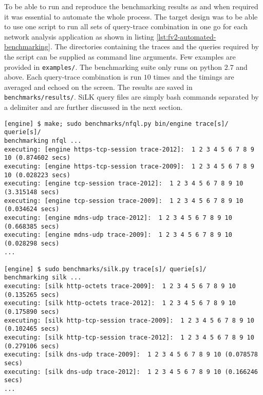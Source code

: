 To be able to run and reproduce the benchmarking results as and when required
it was essential to automate the whole process. The target design was to be
able to use one script to run all sets of query-trace combination in one go
for each network analysis application as shown in listing
\ref{lst:fv2-automated-benchmarking}. The directories containing the traces
and the queries required by the script can be supplied as command line
arguments. Few examples are provided in \texttt{examples/}. The benchmarking
suite only runs on python $2.7$ and above. Each query-trace combination is run
$10$ times and the timings are averaged and echoed on the screen. The results
are saved in \texttt{benchmarks/results/}. SiLK query files are simply bash
commands separated by a delimiter and are further discussed in the next
section.

\begin{lstlisting}
[engine] $ make; sudo benchmarks/nfql.py bin/engine trace[s]/ querie[s]/
benchmarking nfql ...
executing: [engine https-tcp-session trace-2012]:  1 2 3 4 5 6 7 8 9 10 (0.874602 secs)
executing: [engine https-tcp-session trace-2009]:  1 2 3 4 5 6 7 8 9 10 (0.028223 secs)
executing: [engine tcp-session trace-2012]:  1 2 3 4 5 6 7 8 9 10 (3.315148 secs)
executing: [engine tcp-session trace-2009]:  1 2 3 4 5 6 7 8 9 10 (0.034624 secs)
executing: [engine mdns-udp trace-2012]:  1 2 3 4 5 6 7 8 9 10 (0.668385 secs)
executing: [engine mdns-udp trace-2009]:  1 2 3 4 5 6 7 8 9 10 (0.028298 secs)
...

[engine] $ sudo benchmarks/silk.py trace[s]/ querie[s]/
benchmarking silk ...
executing: [silk http-octets trace-2009]:  1 2 3 4 5 6 7 8 9 10 (0.135265 secs)
executing: [silk http-octets trace-2012]:  1 2 3 4 5 6 7 8 9 10 (0.175890 secs)
executing: [silk http-tcp-session trace-2009]:  1 2 3 4 5 6 7 8 9 10 (0.102465 secs)
executing: [silk http-tcp-session trace-2012]:  1 2 3 4 5 6 7 8 9 10 (0.279106 secs)
executing: [silk dns-udp trace-2009]:  1 2 3 4 5 6 7 8 9 10 (0.078578 secs)
executing: [silk dns-udp trace-2012]:  1 2 3 4 5 6 7 8 9 10 (0.166246 secs)
...
\end{lstlisting}
